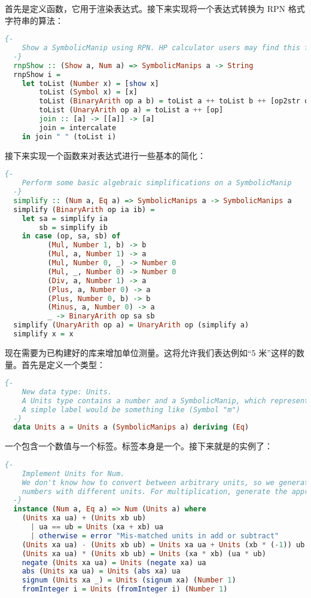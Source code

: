 \documentclass[./main.tex]{subfiles}
\begin{document}
首先是定义函数，它用于渲染表达式。接下来实现将一个表达式转换为 RPN 格式字符串的算法：

\begin{lstlisting}[language=Haskell]
  {-
    Show a SymbolicManip using RPN. HP calculator users may find this familiar.
  -}
  rnpShow :: (Show a, Num a) => SymbolicManips a -> String
  rnpShow i =
    let toList (Number x) = [show x]
        toList (Symbol x) = [x]
        toList (BinaryArith op a b) = toList a ++ toList b ++ [op2str op]
        toList (UnaryArith op a) = toList a ++ [op]
        join :: [a] -> [[a]] -> [a]
        join = intercalate
    in join " " (toList i)
\end{lstlisting}

接下来实现一个函数来对表达式进行一些基本的简化：

\begin{lstlisting}[language=Haskell]
  {-
    Perform some basic algebraic simplifications on a SymbolicManip
  -}
  simplify :: (Num a, Eq a) => SymbolicManips a -> SymbolicManips a
  simplify (BinaryArith op ia ib) =
    let sa = simplify ia
        sb = simplify ib
    in case (op, sa, sb) of
          (Mul, Number 1, b) -> b
          (Mul, a, Number 1) -> a
          (Mul, Number 0, _) -> Number 0
          (Mul, _, Number 0) -> Number 0
          (Div, a, Number 1) -> a
          (Plus, a, Number 0) -> a
          (Plus, Number 0, b) -> b
          (Minus, a, Number 0) -> a
          _ -> BinaryArith op sa sb
  simplify (UnaryArith op a) = UnaryArith op (simplify a)
  simplify x = x
\end{lstlisting}

现在需要为已构建好的库来增加单位测量。这将允许我们表达例如“5 米”这样的数量。首先是定义一个类型：

\begin{lstlisting}[language=Haskell]
  {-
    New data type: Units.
    A Units type contains a number and a SymbolicManip, which represents the units of measure.
    A simple label would be something like (Symbol "m")
  -}
  data Units a = Units a (SymbolicManips a) deriving (Eq)
\end{lstlisting}

一个包含一个数值与一个标签。标签本身是一个。接下来就是的实例了：

\begin{lstlisting}[language=Haskell]
  {-
    Implement Units for Num.
    We don't know how to convert between arbitrary units, so we generate an error if we try to add
    numbers with different units. For multiplication, generate the appropriate new units.
  -}
  instance (Num a, Eq a) => Num (Units a) where
    (Units xa ua) + (Units xb ub)
      | ua == ub = Units (xa + xb) ua
      | otherwise = error "Mis-matched units in add or subtract"
    (Units xa ua) - (Units xb ub) = Units xa ua + Units (xb * (-1)) ub
    (Units xa ua) * (Units xb ub) = Units (xa * xb) (ua * ub)
    negate (Units xa ua) = Units (negate xa) ua
    abs (Units xa ua) = Units (abs xa) ua
    signum (Units xa _) = Units (signum xa) (Number 1)
    fromInteger i = Units (fromInteger i) (Number 1)
\end{lstlisting}
\end{document}
